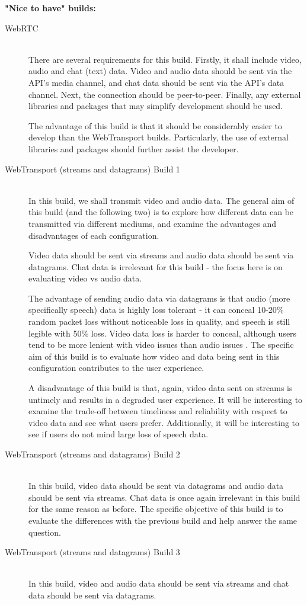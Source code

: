 \textbf{"Nice to have" builds:}
\begin{description}
\item[WebRTC]
\hfill \\
There are several requirements for this build. Firstly, it shall include video, audio and chat (text) data. Video and audio data should be sent via the API's media channel, and chat data should be sent via the API's data channel. Next, the connection should be peer-to-peer. Finally, any external libraries and packages that may simplify development should be used.

The advantage of this build is that it should be considerably easier to develop than the WebTransport builds. Particularly, the use of external libraries and packages should further assist the developer.
\hfill\\
\item[WebTransport (streams and datagrams) Build 1]
\hfill \\
In this build, we shall transmit video and audio data. The general aim of this build (and the following two) is to explore how different data can be transmitted via different mediums, and examine the advantages and disadvantages of each configuration.

Video data should be sent via streams and audio data should be sent via datagrams. Chat data is irrelevant for this build - the focus here is on evaluating video vs audio data. 

The advantage of sending audio data via datagrams is that audio (more specifically speech) data is highly loss tolerant - it can conceal 10-20\% random packet loss without noticeable loss in quality, and speech is still legible with 50\% loss. Video data loss is harder to conceal, although users tend to be more lenient with video issues than audio issues \cite{730750}. The specific aim of this build is to evaluate how video and data being sent in this configuration contributes to the user experience. 

A disadvantage of this build is that, again, video data sent on streams is untimely and results in a degraded user experience. It will be interesting to examine the trade-off between timeliness and reliability with respect to video data and see what users prefer. Additionally, it will be interesting to see if users do not mind large loss of speech data. 
\hfill\\
\item[WebTransport (streams and datagrams) Build 2]
\hfill \\
In this build, video data should be sent via datagrams and audio data should be sent via streams. Chat data is once again irrelevant in this build for the same reason as before. The specific objective of this build is to evaluate the differences with the previous build and help answer the same question.
\hfill\\
\item[WebTransport (streams and datagrams) Build 3]
\hfill \\
In this build, video and audio data should be sent via streams and chat data should be sent via datagrams.


\end{description}
